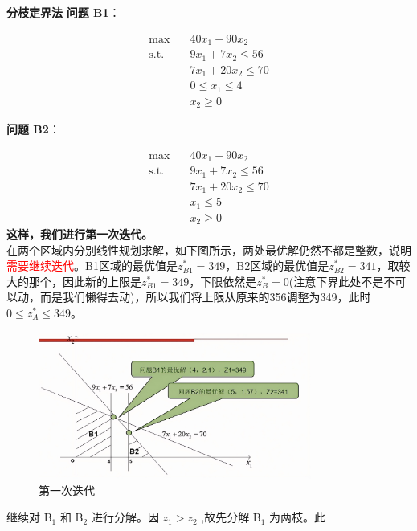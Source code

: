 \begin{exbox}{\textbf{分枝定界法}}
        \textbf{问题 B1}：
        
        \begin{align*}
        \max \quad & 40x_1 + 90x_2 \\
        \text{s.t.} \quad & 9x_1 + 7x_2 \leq 56 \\
        & 7x_1 + 20x_2 \leq 70 \\
        & 0 \leq x_1 \leq 4 \\
        & x_2 \geq 0
        \end{align*}
        
        \textbf{问题 B2}：
        
        \begin{align*}
        \max \quad & 40x_1 + 90x_2 \\
        \text{s.t.} \quad & 9x_1 + 7x_2 \leq 56 \\
        & 7x_1 + 20x_2 \leq 70 \\
        & x_1 \leq 5 \\
        & x_2 \geq 0
        \end{align*}
        \textbf{这样，我们进行第一次迭代。}\\
        在两个区域内分别线性规划求解，如下图所示，两处最优解仍然不都是整数，说明\textcolor{red}{需要继续迭代}。B1区域的最优值是$z_{B1}^* = 349$，B2区域的最优值是$z_{B2}^* = 341$，取较大的那个，因此新的上限是$z_{B1}^* = 349$，下限依然是$z_{B}^* = 0$(注意下界此处不是不可以动，而是我们懒得去动)，所以我们将上限从原来的356调整为349，此时$0\leq z_A^* \leq 349$。\\
        \begin{figure}[H]
            \centering
            \includegraphics[width=0.8\textwidth]{./image/12.png}
            \caption{第一次迭代}
            \label{fig:Chapter4_Temporary_Pavilion_4}
        \end{figure}
        继续对 \( \text{B}_{1} \) 和 \( \text{B}_{2} \) 进行分解。因 \( {z}_{1} > {z}_{2} \) ,故先分解 \( \text{B}_{1} \) 为两枝。此

\end{exbox}

